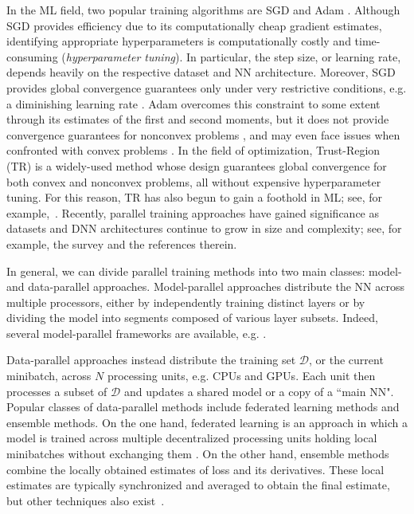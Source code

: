\documentclass{article}
\begin{document}
In the ML field, two popular training algorithms are SGD and Adam \cite{kingmaAdam2014}. Although SGD provides efficiency due to its computationally cheap gradient estimates, identifying appropriate hyperparameters is computationally costly and time-consuming (\textit{hyperparameter tuning}). In particular, the step size, or learning rate, depends heavily on the respective dataset and NN architecture. Moreover, SGD provides global convergence guarantees only under very restrictive conditions, e.g. a diminishing learning rate \cite{bottouNocedal2018}. Adam overcomes this constraint to some extent through its estimates of the first and second moments, but it does not provide convergence guarantees for nonconvex problems \cite{kingmaAdam2014}, and may even face issues when confronted with convex problems \cite{reddiEtAl2018OpenReview}. 
In the field of optimization, Trust-Region (TR) \cite{connGouldToint2000} is a widely-used method whose design guarantees global convergence for both convex and nonconvex problems, all without expensive hyperparameter tuning.
For this reason, TR has also begun to gain a foothold in ML; see, for example,~\cite{kopanickovaKrause2022, gratton2023multilevel}. Recently, parallel training approaches have gained significance as datasets and DNN architectures continue to grow in size and complexity; see, for example, the survey \cite{nicholsEtAl2021} and the references therein.

In general, we can divide parallel training methods into two main classes: model- and data-parallel approaches.
Model-parallel approaches distribute the NN across multiple processors, either by independently training distinct layers or by dividing the model into segments composed of various layer subsets. 
Indeed, several model-parallel frameworks are available, e.g. \cite{ rasleyEtAl2020}. 

Data-parallel approaches instead distribute the training set $\mathcal{D}$, or the current minibatch, across $N$ processing units, e.g. CPUs and GPUs. Each unit then processes a subset of $\mathcal{D}$ and updates a shared model or a copy of a ``main NN". 
Popular classes of data-parallel methods include federated learning methods and ensemble methods.
On the one hand, federated learning is an approach in which a model is trained across multiple decentralized processing units holding local minibatches without exchanging them \cite{mcmahanEtAl2017}. On the other hand, ensemble methods combine the locally obtained estimates of loss and its derivatives. These local estimates are typically synchronized and averaged to obtain the final estimate, but other techniques also exist~\cite{dietterich2000}. 
\end{document}
